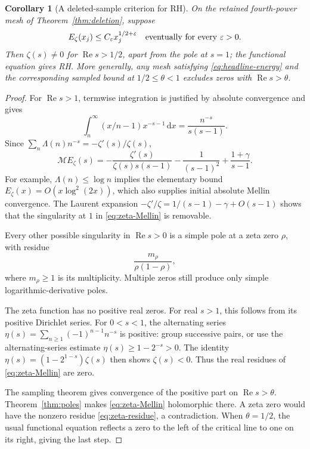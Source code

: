 \documentclass[11pt]{article}
\newtheorem{corollary}[theorem]{Corollary}
\theoremstyle{definition}
\newcommand{\ep}{\varepsilon}
\newcommand{\Rea}{\operatorname{Re}}
\newcommand{\Mell}{\mathcal M}
\newcommand{\dd}{\,\mathrm d}
\begin{document}
\begin{corollary}[A deleted-sample criterion for RH]\label{cor:zeta}
On the retained fourth-power mesh of Theorem~\ref{thm:deletion}, suppose
\begin{equation}\label{eq:zeta-sampled}
 E_\zeta(x_j)\leq C_\ep x_j^{1/2+\ep}
 \quad\hbox{eventually for every }\ep>0.
\end{equation}
Then \(\zeta(s)\neq0\) for \(\Rea s>1/2\), apart from the pole at
\(s=1\); the functional equation gives RH. More generally, any mesh
satisfying \eqref{eq:headline-energy} and the corresponding sampled
bound at \(1/2\leq\theta<1\) excludes zeros with \(\Rea s>\theta\).
\end{corollary}
\begin{proof}
For \(\Rea s>1\), termwise integration is justified by absolute
convergence and gives
\[
 \int_n^\infty(x/n-1)x^{-s-1}\dd x=\frac{n^{-s}}{s(s-1)}.
\]
Since \(\sum_n\Lambda(n)n^{-s}=-\zeta'(s)/\zeta(s)\),
\begin{equation}\label{eq:zeta-Mellin}
 \Mell E_\zeta(s)
 =-\frac{\zeta'(s)}{\zeta(s)s(s-1)}
       -\frac1{(s-1)^2}+\frac{1+\gamma}{s-1}.
\end{equation}
For example, \(\Lambda(n)\leq\log n\) implies the elementary bound
\(E_\zeta(x)=O(x\log^2(2x))\), which also supplies initial absolute
Mellin convergence. The Laurent expansion
\(-\zeta'/\zeta=1/(s-1)-\gamma+O(s-1)\) shows that the singularity
at \(1\) in \eqref{eq:zeta-Mellin} is removable.

Every other possible singularity in \(\Rea s>0\) is a simple pole at
a zeta zero \(\rho\), with residue
\begin{equation}\label{eq:zeta-residue}
 \frac{m_\rho}{\rho(1-\rho)},
\end{equation}
where \(m_\rho\geq1\) is its multiplicity. Multiple zeros still produce
only simple logarithmic-derivative poles.

The zeta function has no positive real zeros. For real \(s>1\), this
follows from its positive Dirichlet series. For \(0<s<1\), the
alternating series
\(\eta(s)=\sum_{n\geq1}(-1)^{n-1}n^{-s}\) is positive: group
successive pairs, or use the alternating-series estimate
\(\eta(s)\geq1-2^{-s}>0\). The identity
\(\eta(s)=(1-2^{1-s})\zeta(s)\) then shows \(\zeta(s)<0\).
Thus the real residues of \eqref{eq:zeta-Mellin} are zero.

The sampling theorem gives convergence of the positive part on
\(\Rea s>\theta\). Theorem~\ref{thm:poles} makes
\eqref{eq:zeta-Mellin} holomorphic there. A zeta zero would have the
nonzero residue \eqref{eq:zeta-residue}, a contradiction. When
\(\theta=1/2\), the usual functional equation reflects a zero to the
left of the critical line to one on its right, giving the last step.
\end{proof}
\end{document}
